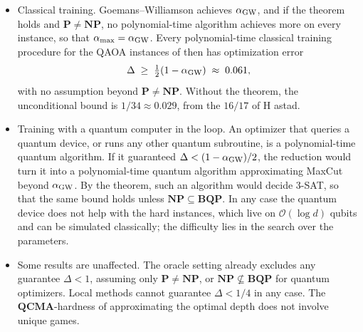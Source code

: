 \documentclass[handoutsbeamer.tex]{subfiles}
\begin{document}
\begin{frame}
\onp{\scriptsize}
\begin{itemize}\setlength\itemsep{0.3em}
    \item Classical training. Goemans--Williamson achieves $\alpha_{\rm GW}$, and if the theorem holds and $\mathbf P\ne\mathbf{NP}$, no polynomial-time algorithm achieves more on every instance, so that $\alpha_{\max} = \alpha_{\rm GW}$. Every polynomial-time classical training procedure for the QAOA instances of  then has optimization error
    \begin{equation*}
        \Delta \;\ge\; \tfrac12(1-\alpha_{\rm GW}) \;\approx\; 0.061,
    \end{equation*}
    with no assumption beyond $\mathbf P\ne\mathbf{NP}$. Without the theorem, the unconditional bound is $1/34 \approx 0.029$, from the $16/17$ of H astad.
    \item Training with a quantum computer in the loop. An optimizer that queries a quantum device, or runs any other quantum subroutine, is a polynomial-time quantum algorithm. If it guaranteed $\Delta < (1-\alpha_{\rm GW})/2$, the reduction would turn it into a polynomial-time quantum algorithm approximating MaxCut beyond $\alpha_{\rm GW}$. By the theorem, such an algorithm would decide 3-SAT, so that the same bound holds unless $\mathbf{NP}\subseteq\mathbf{BQP}$. In any case the quantum device does not help with the hard instances, which live on $\mathcal O(\log d)$ qubits and can be simulated classically; the difficulty lies in the search over the parameters.
    \item Some results are unaffected. The oracle setting already excludes any guarantee $\Delta<1$, assuming only $\mathbf P\ne\mathbf{NP}$, or $\mathbf{NP}\not\subseteq\mathbf{BQP}$ for quantum optimizers. Local methods cannot guarantee $\Delta<1/4$ in any case. The $\mathbf{QCMA}$-hardness of approximating the optimal depth \citep{bittelQCMA} does not involve unique games.
\end{itemize}
\end{frame}
\end{document}
